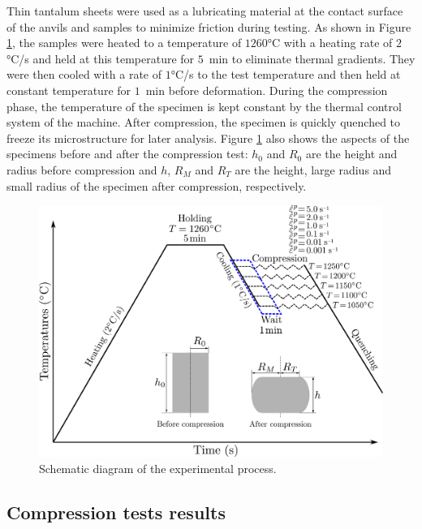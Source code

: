 \documentclass[twoside,english,1p,final,sort&compress]{elsarticle}
\theoremstyle{plain}
\begin{document}
Thin tantalum sheets were used as a lubricating material at the contact surface of the anvils and samples to minimize friction during testing. As shown in Figure \ref{fig:GleebleProcess}, the samples were heated to a temperature of $1260$°C with a heating rate of $2$°C/s and held at this temperature for $5$~min to eliminate thermal gradients. They were then cooled with a rate of $1$°C/s to the test temperature and then held at constant temperature for $1$~min before deformation. During the compression phase, the temperature of the specimen is kept constant by the thermal control system of the machine. After compression, the specimen is quickly quenched to freeze its microstructure for later analysis. Figure \ref{fig:GleebleProcess} also shows the aspects of the specimens before and after the compression test: $h_0$ and $R_0$ are the height and radius before compression and $h$, $R_M$ and $R_T$ are the height, large radius and small radius of the specimen after compression, respectively.

\begin{figure}[!ht]
\centering
\includegraphics[width=0.8\columnwidth]{Figures/GleebleProcess}
\caption{Schematic diagram of the experimental process.}
\label{fig:GleebleProcess}
\end{figure}

\subsection{Compression tests results}
\end{document}
